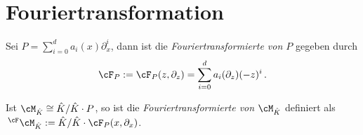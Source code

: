 \section{Fouriertransformation}
\begin{defn}[Fouriertransformation]
Sei $P=\sum_{i=0}^da_i(x)\partial_x^i$, dann ist die
\emph{Fouriertransformierte von $P$} gegeben durch
\[
\cF_P:=\cF_P(z,\partial_z)=\sum_{i=0}^da_i(\partial_z)(-z)^i \,.
\]
\begin{comment}
\cite[Def 3.1]{Bloch_localfourier}
\cite{GarciaLopez04}
\cite[Def 6.1]{ZulaBarbara}
\end{comment}
\end{defn}
\begin{defn} %
Ist $\cM_{\hat K}\cong\hat K / \hat K \cdot P$, so ist die
\emph{Fouriertransformierte von $\cM_{\hat K}$} definiert als  $\,^\cF\cM_{\hat
K}:=\hat K / \hat K \cdot \cF_P(x,\partial_x)$.
\end{defn}
